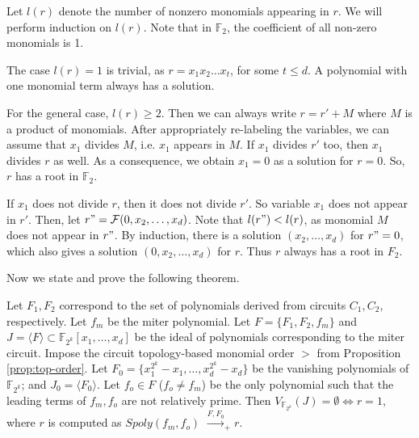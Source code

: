 \begin{Proof}
Let $l(r)$ denote the number of nonzero monomials appearing in $r$. We
will perform induction on $l(r)$. Note that in $\mathbb{F}_2$,
the coefficient of all non-zero monomials is 1.

The case $l(r)=1$ is trivial, as $r = x_1x_2\dots x_t$, for some $t
\leq d$. A polynomial with one monomial term always has a solution. 

For the general case, $l(r) \geq 2$. Then  we can always write $r =
r' + M$ where $M$ is a product of monomials. After appropriately
re-labeling the variables, we can assume that $x_1$ divides $M$,
i.e. $x_1$ appears in $M$. If $x_1$ divides $r'$ too, then $x_1$
divides $r$ as well. As a consequence, we obtain $x_1=0$ as a
solution for $r=0$. So, $r$ has a root in $\mathbb{F}_2$. 

If $x_1$ does not divide $r$, then it does not divide $r'$. So
variable $x_1$ does not appear in $r'$. Then, let $r"=\mathcal{F}(0,
x_2,\ldots, x_d)$. Note that $l(r") < l(r)$, as monomial $M$ does not
appear in $r"$. By induction, there is a solution $(x_2, \dots, x_d)$
for $r"=0$, which also gives a solution $(0, x_2, \ldots, x_d)$ for
$r$.  Thus $r$ always has a root in $F_2$.
\end{Proof}

Now we state and prove the following theorem.

\begin{Theorem}\label{thm:miter}
Let $F_1, F_2$ correspond to the set of polynomials
derived from circuits $C_1, C_2$, respectively. Let $f_m$ be the miter
polynomial. Let $F = \{F_1, F_2, f_m\}$ and $J=\langle F \rangle
\subset \mathbb{F}_{2^k}[x_{1},\dots,x_{d}]$ be the ideal of
polynomials corresponding to the miter circuit. Impose the circuit
topology-based monomial order $>$ from Proposition
\ref{prop:top-order}. Let $F_0 = \{ x_1^{2^k} - x_1, \dots,
x_d^{2^k} - x_d\}$ be the vanishing polynomials of $\mathbb{F}_{2^k}$;
and $J_0 = \langle F_0 \rangle$. Let $f_o \in F$ ($f_o \neq f_m$)
be the only polynomial such that  the leading terms of $f_m, f_o$ are
not relatively prime. Then $V_{\mathbb{F}_{2^k}}(J)=\emptyset \iff
r=1$, where $r$ is computed as  $Spoly(f_m, f_o)$
$\stackrel{F,F_0}{\longrightarrow}_+ r$. 

\end{Theorem}


